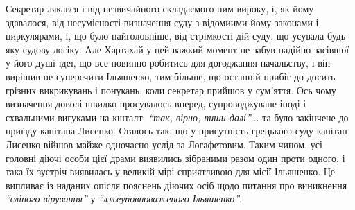 \documentclass[a4paper,20pt]{report}
\begin{document}
Секретар лякався і від незвичайного складаємого ним вироку, і, як йому здавалося,
від несумісності визначення суду
з відомиими йому законами і циркулярами, і, що було найголовніше, від стрімкості дій суду,
що усувала будь-яку судову логіку.
Але Хартахай у цей важкий момент не забув надійно засівшої у його душі ідеї, що
все повинно робитись для догоджання начальству, і він вирішив не суперечити
Ільяшенко, тим більше, що останній прибіг
до досить грізних викрикувань і понукань, коли секретар прийшов у сум'яття. Ось чому
визначення доволі швидко просувалось вперед, супроводжуване іноді і схвальними вигуками на кшталт:
\emph{``так, вірно, пиши далі''}... та було закінчене до приїзду капітана Лисенко. 
Сталось так, що у присутність грецького суду капітан Лисенко війшов майже одночасно
услід за Логафетовим. Таким чином, усі головні діючі особи цієї драми виявились зібраними
разом один проти одного, і така їх зустріч виявилась у великій мірі сприятливою для місії Ільяшенко.
Це випливає із наданих опісля пояснень діючих осіб щодо питання про виникнення \emph{``сліпого вірування''}
у \emph{``лжеуповноваженого Ільяшенко''}.
\end{document}
